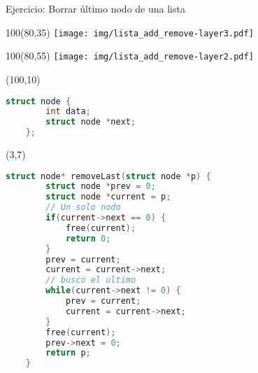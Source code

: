 \documentclass[aspectratio=169]{beamer}
\begin{document}
\begin{frame}[fragile]{Ejercicio: Borrar último nodo de una lista}
    \begin{textblock}{100}(80,35) \texttt{[image: img/lista\_add\_remove-layer3.pdf]} \end{textblock}
    \begin{textblock}{100}(80,55) \texttt{[image: img/lista\_add\_remove-layer2.pdf]} \end{textblock}
    \begin{textblock}{60}(100,10)
    \small
    \begin{lstlisting}[language=C,basicstyle=\ttfamily,columns=fullflexible]
    struct node {
        int data;
        struct node *next;
    };
    \end{lstlisting}
    \end{textblock}
    \begin{textblock}{90}(3,7)
    \small
    \begin{lstlisting}[language=C,basicstyle=\ttfamily,columns=fullflexible]
    struct node* removeLast(struct node *p) {
        struct node *prev = 0;
        struct node *current = p;
        // Un solo nodo
        if(current->next == 0) {
            free(current);
            return 0;
        }
        prev = current;
        current = current->next;
        // busco el ultimo
        while(current->next != 0) {
            prev = current;
            current = current->next;
        }
        free(current);
        prev->next = 0;
        return p;
    }
    \end{lstlisting}
    \end{textblock}
\end{frame}
\end{document}
